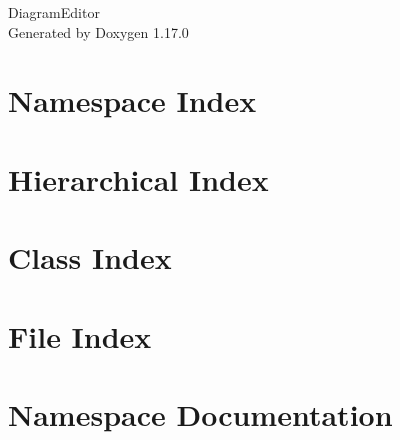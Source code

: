 \documentclass[twoside]{book}
\newcommand{\+}{\discretionary{\mbox{\scriptsize$\hookleftarrow$}}{}{}}
\newcommand{\clearemptydoublepage}{%
    \newpage{\pagestyle{empty}\cleardoublepage}%
  }
\begin{document}
  \raggedbottom
    \hypersetup{pageanchor=false,
                bookmarksnumbered=true,
                pdfencoding=unicode
               }
  \begin{titlepage}
  \vspace*{7cm}
  \begin{center}%
  {\Large Diagram\+Editor}\\
  \vspace*{1cm}
  {\large Generated by Doxygen 1.17.0}\\
  \end{center}
  \end{titlepage}
  \clearemptydoublepage
  \tableofcontents
  \clearemptydoublepage
  \hypersetup{pageanchor=true}

\chapter{Namespace Index}

\chapter{Hierarchical Index}

\chapter{Class Index}

\chapter{File Index}

\chapter{Namespace Documentation}






\end{document}
